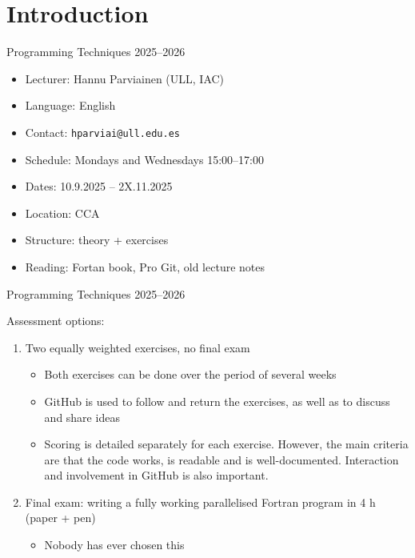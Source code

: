 
\subtitle{Lecture 1: Introduction and Version Control}



\begin{frame}
  \titlepage
\end{frame}

\section{Introduction}

\begin{frame}{Programming Techniques 2025--2026}
  \begin{itemize}
    \item Lecturer: Hannu Parviainen (ULL, IAC)
    \item Language: English
    \item Contact: \texttt{hparviai@ull.edu.es}
    \item Schedule: Mondays and Wednesdays 15:00--17:00
    \item Dates: 10.9.2025 -- 2X.11.2025
    \item Location: CCA
    \item Structure: theory + exercises
    \item Reading: Fortan book, Pro Git, old lecture notes
  \end{itemize}
\end{frame}

\begin{frame}{Programming Techniques 2025--2026}
	\begin{block}{Assessment options:}
		\begin{enumerate}
			\item Two equally weighted exercises, no final exam
			\begin{itemize}
				\item Both exercises can be done over the period of several weeks
				\item GitHub is used to follow and return the exercises, as well as to discuss and share ideas
				\item Scoring is detailed separately for each exercise. However, the main criteria are that the code works, is readable and is well-documented. Interaction and involvement in GitHub is also important.
			\end{itemize}
			\vspace{0.25cm}
			\item Final exam: writing a fully working parallelised Fortran program in 4 h (paper + pen)
			\begin{itemize}
				\item Nobody has ever chosen this
			\end{itemize}
		\end{enumerate}
	\end{block}
\end{frame}



